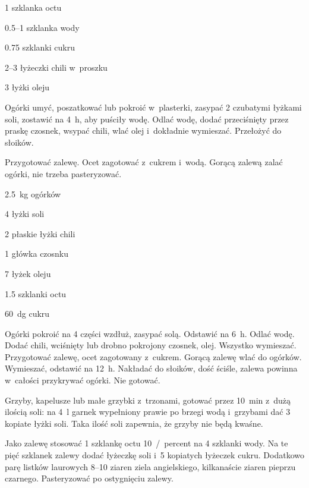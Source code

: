 \documentclass[../kucharek.tex]{subfiles}
\begin{document}
\begin{Ingred}[zalewa]
    \item \num{1} szklanka octu
    \item \numrange{0.5}{1} szklanka wody
    \item \num{0.75} szklanki cukru
    \item \numrange{2}{3} łyżeczki chili w~proszku
    \item \num{3} łyżki oleju
\end{Ingred}

Ogórki umyć, poszatkować lub pokroić w~plasterki, zasypać \num{2} czubatymi
łyżkami soli, zostawić na \qty{4}{\hour}, aby puściły wodę. Odlać wodę, dodać
przeciśnięty przez praskę czosnek, wsypać chili, wlać olej i~dokładnie
wymieszać. Przełożyć do słoików.

Przygotować zalewę. Ocet zagotować z~cukrem i~wodą. Gorącą zalewą zalać ogórki,
nie trzeba pasteryzować.


\begin{Ingred}
    \item \qty{2.5}{\kilo\gram} ogórków
    \item \num{4} łyżki soli
    \item \num{2} płaskie łyżki chili
    \item \num{1} główka czosnku
    \item \num{7} łyżek oleju
    \item \num{1.5} szklanki octu
    \item \qty{60}{\deka\gram} cukru
\end{Ingred}

Ogórki pokroić na \num{4} części wzdłuż, zasypać solą. Odstawić na
\qty{6}{\hour}. Odlać wodę. Dodać chili, wciśnięty lub drobno pokrojony
czosnek, olej. Wszystko wymieszać. Przygotować zalewę, ocet zagotowany
z~cukrem. Gorącą zalewę wlać do ogórków. Wymieszać, odstawić na
\qty{12}{\hour}. Nakładać do słoików, dość ściśle, zalewa powinna w~całości
przykrywać ogórki. Nie gotować.


Grzyby, kapelusze lub małe grzybki z~trzonami, gotować przez \qty{10}{\minute}
z~dużą ilością soli: na \qty{4}{\litre} garnek wypełniony prawie po brzegi wodą
i~grzybami dać \num{3} kopiate łyżki soli. Taka ilość soli zapewnia, że grzyby
nie będą kwaśne.

Jako zalewę stosować \num{1} szklankę octu \qty{10}{/percent} na \num{4}
szklanki wody. Na te pięć szklanek zalewy dodać łyżeczkę soli i~\num{5}
kopiatych łyżeczek cukru. Dodatkowo parę listków laurowych \numrange{8}{10}
ziaren ziela angielskiego, kilkanaście ziaren pieprzu czarnego. Pasteryzować po
ostygnięciu zalewy.
\end{document}
